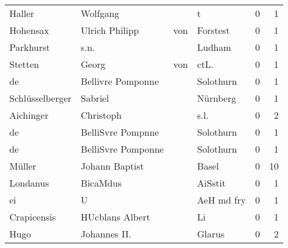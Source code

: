 \begin{tabular}{llllrr}
                   Haller &                           Wolfgang &             &                                           t &          0 &         1 \\
                 Hohensax &                     Ulrich Philipp &         von &                                    Forstest &          0 &         1 \\
                Parkhurst &                               s.n. &             &                                      Ludham &          0 &         1 \\
                  Stetten &                              Georg &         von &                                       ctL.  &          0 &         1 \\
                       de &                  Bellivre Pomponne &             &                                   Solothurn &          0 &         1 \\
          Schlüsselberger &                            Sabriel &             &                                    Nürnberg &          0 &         1 \\
                Aichinger &                          Christoph &             &                                        s.l. &          0 &         2 \\
                       de &                  BelliSvre Pompnne &             &                                   Solothurn &          0 &         1 \\
                       de &                 BelliSvre Pomponne &             &                                   Solothurn &          0 &         1 \\
                   Müller &                     Johann Baptist &             &                                       Basel &          0 &        10 \\
                 Londanus &                           BicaMdus &             &                                     AiSstit &          0 &         1 \\
                       ei &                                  U &             &                                  AeH md fry &          0 &         1 \\
              Crapicensis &                    HUcblans Albert &             &                                          Li &          0 &         1 \\
                     Hugo &                       Johannes II. &             &                                      Glarus &          0 &         2 \\

\end{tabular}
